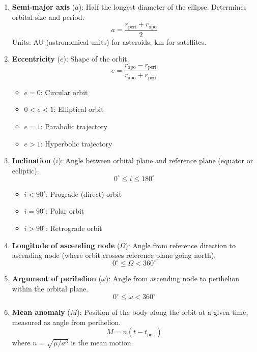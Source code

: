 \begin{enumerate}
    \item \textbf{Semi-major axis} ($a$): Half the longest diameter of the ellipse. Determines orbital size and period.
    \begin{equation}
        a = \frac{r_{\text{peri}} + r_{\text{apo}}}{2}
    \end{equation}
    Units: AU (astronomical units) for asteroids, km for satellites.
    
    \item \textbf{Eccentricity} ($e$): Shape of the orbit.
    \begin{equation}
        e = \frac{r_{\text{apo}} - r_{\text{peri}}}{r_{\text{apo}} + r_{\text{peri}}}
    \end{equation}
    \begin{itemize}
        \item $e = 0$: Circular orbit
        \item $0 < e < 1$: Elliptical orbit
        \item $e = 1$: Parabolic trajectory
        \item $e > 1$: Hyperbolic trajectory
    \end{itemize}
    
    \item \textbf{Inclination} ($i$): Angle between orbital plane and reference plane (equator or ecliptic).
    \begin{equation}
        0^\circ \leq i \leq 180^\circ
    \end{equation}
    \begin{itemize}
        \item $i < 90^\circ$: Prograde (direct) orbit
        \item $i = 90^\circ$: Polar orbit
        \item $i > 90^\circ$: Retrograde orbit
    \end{itemize}
    
    \item \textbf{Longitude of ascending node} ($\Omega$): Angle from reference direction to ascending node (where orbit crosses reference plane going north).
    \begin{equation}
        0^\circ \leq \Omega < 360^\circ
    \end{equation}
    
    \item \textbf{Argument of perihelion} ($\omega$): Angle from ascending node to perihelion within the orbital plane.
    \begin{equation}
        0^\circ \leq \omega < 360^\circ
    \end{equation}
    
    \item \textbf{Mean anomaly} ($M$): Position of the body along the orbit at a given time, measured as angle from perihelion.
    \begin{equation}
        M = n(t - t_{\text{peri}})
    \end{equation}
    where $n = \sqrt{\mu/a^3}$ is the mean motion.
\end{enumerate}

